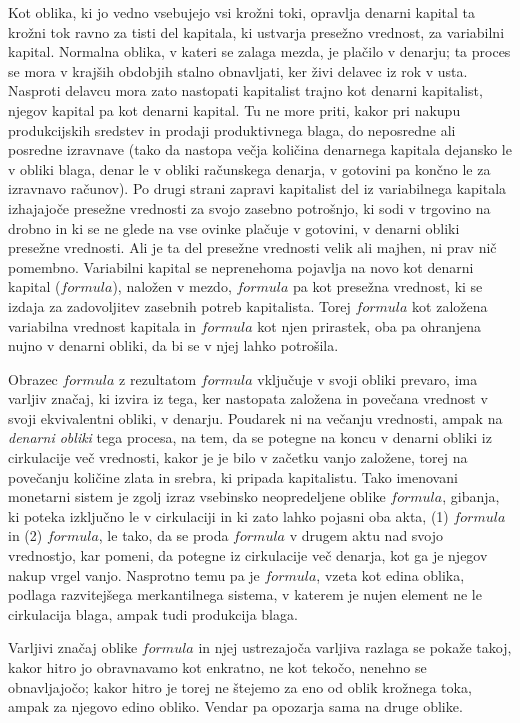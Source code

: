 \documentclass[kapital_02.tex]{subfiles}
\begin{document}
Kot oblika, ki jo vedno vsebujejo vsi krožni toki, opravlja denarni kapital ta krožni tok ravno za tisti del kapitala, ki ustvarja presežno vrednost, za variabilni kapital. Normalna oblika, v kateri se zalaga mezda, je plačilo v denarju; ta proces se mora v krajših obdobjih stalno obnavljati, ker živi delavec iz rok v usta. Nasproti delavcu mora zato nastopati kapitalist trajno kot denarni kapitalist, njegov kapital pa kot denarni kapital. Tu ne more priti, kakor pri nakupu produkcijskih sredstev in prodaji produktivnega blaga, do neposredne ali posredne izravnave (tako da nastopa večja količina denarnega kapitala dejansko le v obliki blaga, denar le v obliki računskega denarja, v gotovini pa končno le za izravnavo računov). Po drugi strani zapravi kapitalist del iz variabilnega kapitala izhajajoče presežne vrednosti za svojo zasebno potrošnjo, ki sodi v trgovino na drobno in ki se ne glede na vse ovinke plačuje v gotovini, v denarni obliki presežne vrednosti. Ali je ta del presežne vrednosti velik ali majhen, ni prav nič pomembno. Variabilni kapital se neprenehoma pojavlja na novo kot denarni kapital (\( formula \)), naložen v mezdo, \( formula \) pa kot presežna vrednost, ki se izdaja za zadovoljitev zasebnih potreb kapitalista. Torej \( formula \) kot založena variabilna vrednost kapitala in \( formula \) kot njen prirastek, oba pa ohranjena nujno v denarni obliki, da bi se v njej lahko potrošila.

Obrazec \( formula \) z rezultatom \( formula \) vključuje v svoji obliki prevaro, ima varljiv značaj, ki izvira iz tega, ker nastopata založena in povečana vrednost v svoji ekvivalentni obliki, v denarju. Poudarek ni na večanju vrednosti, ampak na \emph{denarni obliki} tega procesa, na tem, da se potegne na koncu v denarni obliki iz cirkulacije več vrednosti, kakor je je bilo v začetku vanjo založene, torej na povečanju količine zlata in srebra, ki pripada kapitalistu. Tako imenovani monetarni sistem je zgolj izraz vsebinsko neopredeljene oblike \( formula \), gibanja, ki poteka izključno le v cirkulaciji in ki zato lahko pojasni oba akta, (1) \( formula \) in (2) \( formula \), le tako, da se proda \( formula \) v drugem aktu nad svojo vrednostjo, kar pomeni, da potegne iz cirkulacije več denarja, kot ga je njegov nakup vrgel vanjo. Nasprotno temu pa je \( formula \), vzeta kot edina oblika, podlaga razvitejšega merkantilnega sistema, v katerem je nujen element ne le cirkulacija blaga, ampak tudi produkcija blaga.

Varljivi značaj oblike \( formula \) in njej ustrezajoča varljiva razlaga se pokaže takoj, kakor hitro jo obravnavamo kot enkratno, ne kot tekočo, nenehno se obnavljajočo; kakor hitro je torej ne štejemo za eno od oblik krožnega toka, ampak za njegovo edino obliko. Vendar pa opozarja sama na druge oblike.
\end{document}
